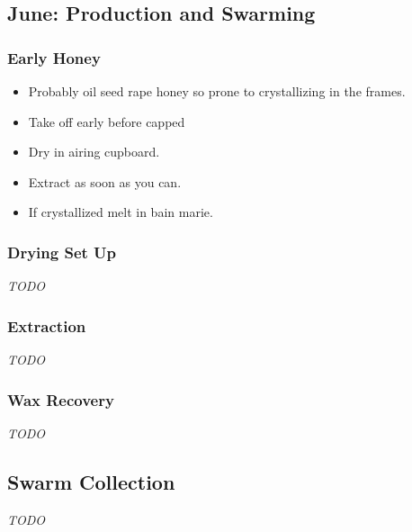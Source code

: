 \subsection{June: Production and Swarming}

\subsubsection{Early Honey}

\begin{itemize}
    \item Probably oil seed rape honey so prone to crystallizing in the frames.
    \item Take off early before capped
    \item Dry in airing cupboard.
    \item Extract as soon as you can.
    \item If crystallized melt in bain marie.
\end{itemize}

\subsubsection{Drying Set Up}

\emph{TODO}

\subsubsection{Extraction}

\emph{TODO}

\subsubsection{Wax Recovery}

\emph{TODO}


\subsection{Swarm Collection}

\emph{TODO}

